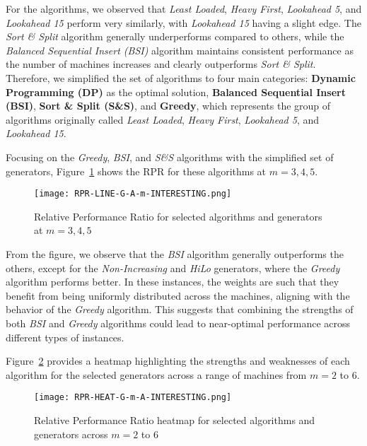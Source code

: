 For the algorithms, we observed that \textit{Least Loaded}, \textit{Heavy First}, \textit{Lookahead 5}, and \textit{Lookahead 15} perform very similarly, with \textit{Lookahead 15} having a slight edge. The \textit{Sort \& Split} algorithm generally underperforms compared to others, while the \textit{Balanced Sequential Insert (BSI)} algorithm maintains consistent performance as the number of machines increases and clearly outperforms \textit{Sort \& Split}. Therefore, we simplified the set of algorithms to four main categories: \textbf{Dynamic Programming (DP)} as the optimal solution, \textbf{Balanced Sequential Insert (BSI)}, \textbf{Sort \& Split (S\&S)}, and \textbf{Greedy}, which represents the group of algorithms originally called \textit{Least Loaded}, \textit{Heavy First}, \textit{Lookahead 5}, and \textit{Lookahead 15}.

Focusing on the \textit{Greedy}, \textit{BSI}, and \textit{S\&S} algorithms with the simplified set of generators, Figure~\ref{fig:RPR-LINE-G-A-m-INTERESTING} shows the RPR for these algorithms at $m = 3, 4, 5$.

\begin{figure}
    \centering
    \texttt{[image: RPR-LINE-G-A-m-INTERESTING.png]}
    \caption{Relative Performance Ratio for selected algorithms and generators at $m = 3, 4, 5$}
    \label{fig:RPR-LINE-G-A-m-INTERESTING}
\end{figure}

From the figure, we observe that the \textit{BSI} algorithm generally outperforms the others, except for the \textit{Non-Increasing} and \textit{HiLo} generators, where the \textit{Greedy} algorithm performs better. In these instances, the weights are such that they benefit from being uniformly distributed across the machines, aligning with the behavior of the \textit{Greedy} algorithm. This suggests that combining the strengths of both \textit{BSI} and \textit{Greedy} algorithms could lead to near-optimal performance across different types of instances.

Figure~\ref{fig:RPR-HEAT-G-m-A-INTERESTING} provides a heatmap highlighting the strengths and weaknesses of each algorithm for the selected generators across a range of machines from $m = 2$ to $6$.

\begin{figure}
    \centering
    \texttt{[image: RPR-HEAT-G-m-A-INTERESTING.png]}
    \caption{Relative Performance Ratio heatmap for selected algorithms and generators across $m = 2$ to $6$}
    \label{fig:RPR-HEAT-G-m-A-INTERESTING}
\end{figure}

